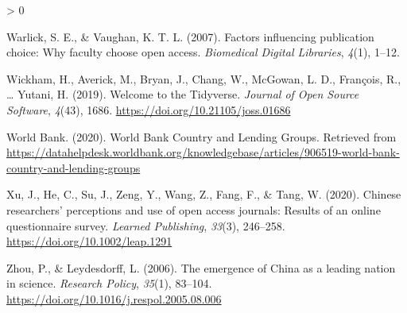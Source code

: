 \documentclass[
  english,
  man]{apa6}
\newlength{\cslhangindent}
\newenvironment{CSLReferences}[2] %
 {%
  \setlength{\parindent}{0pt}
  \ifodd #1 \everypar{\setlength{\hangindent}{\cslhangindent}}\ignorespaces\fi
  \ifnum #2 > 0
  \setlength{\parskip}{#2\baselineskip}
  \fi
 }%
 {}
\begin{document}
\begin{CSLReferences}{1}{0}
\leavevmode\hypertarget{ref-warlick_factors_2007}{}%
Warlick, S. E., \& Vaughan, K. T. L. (2007). Factors influencing publication choice: Why faculty choose open access. \emph{Biomedical Digital Libraries}, \emph{4}(1), 1--12.

\leavevmode\hypertarget{ref-wickham_welcome_2019}{}%
Wickham, H., Averick, M., Bryan, J., Chang, W., McGowan, L. D., François, R., \ldots{} Yutani, H. (2019). Welcome to the {Tidyverse}. \emph{Journal of Open Source Software}, \emph{4}(43), 1686. \url{https://doi.org/10.21105/joss.01686}

\leavevmode\hypertarget{ref-world_bank_world_2020}{}%
World Bank. (2020). World {Bank} {Country} and {Lending} {Groups}. Retrieved from \url{https://datahelpdesk.worldbank.org/knowledgebase/articles/906519-world-bank-country-and-lending-groups}

\leavevmode\hypertarget{ref-xu_chinese_2020}{}%
Xu, J., He, C., Su, J., Zeng, Y., Wang, Z., Fang, F., \& Tang, W. (2020). Chinese researchers' perceptions and use of open access journals: {Results} of an online questionnaire survey. \emph{Learned Publishing}, \emph{33}(3), 246--258. \url{https://doi.org/10.1002/leap.1291}

\leavevmode\hypertarget{ref-zhou_emergence_2006}{}%
Zhou, P., \& Leydesdorff, L. (2006). The emergence of {China} as a leading nation in science. \emph{Research Policy}, \emph{35}(1), 83--104. \url{https://doi.org/10.1016/j.respol.2005.08.006}

\end{CSLReferences}
\end{document}
